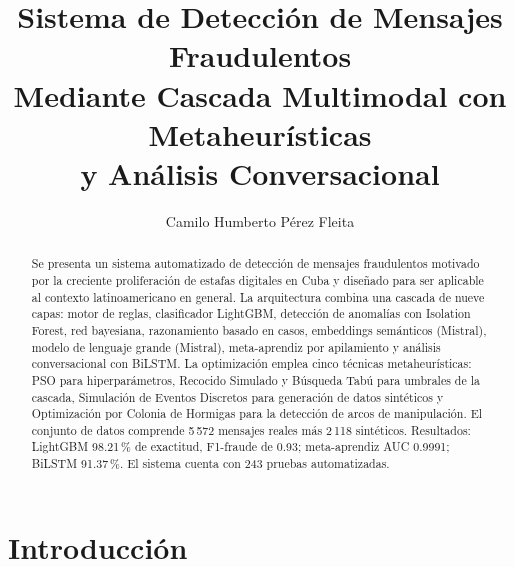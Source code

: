 \documentclass{llncs}
\begin{document}

\title{Sistema de Detección de Mensajes Fraudulentos\\
Mediante Cascada Multimodal con Metaheurísticas\\
y Análisis Conversacional}

\author{Camilo Humberto Pérez Fleita}


\maketitle

\begin{abstract}
Se presenta un sistema automatizado de detección de mensajes fraudulentos
motivado por la creciente proliferación de estafas digitales en Cuba
y diseñado para ser aplicable al contexto latinoamericano en general.
La arquitectura combina una cascada de nueve capas:
motor de reglas, clasificador LightGBM, detección de anomalías
con Isolation Forest, red bayesiana, razonamiento basado en casos,
embeddings semánticos (Mistral), modelo de lenguaje grande (Mistral),
meta-aprendiz por apilamiento y análisis conversacional con BiLSTM.
La optimización emplea cinco técnicas metaheurísticas:
PSO para hiperparámetros, Recocido Simulado y Búsqueda Tabú para
umbrales de la cascada, Simulación de Eventos Discretos para
generación de datos sintéticos y Optimización por Colonia de Hormigas
para la detección de arcos de manipulación.
El conjunto de datos comprende 5\,572 mensajes reales más 2\,118 sintéticos.
Resultados: LightGBM 98.21\,\% de exactitud, F1-fraude de 0.93;
meta-aprendiz AUC 0.9991; BiLSTM 91.37\,\%.
El sistema cuenta con 243 pruebas automatizadas.
\end{abstract}

\section{Introducción}
\label{sec:intro}
\end{document}
